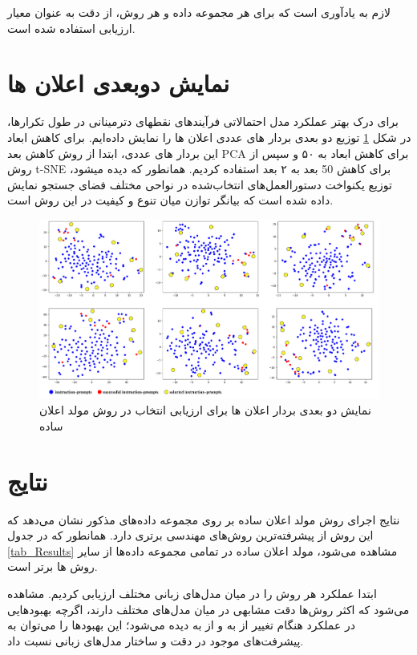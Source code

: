 لازم به یادآوری است که برای هر مجموعه داده و هر روش، از دقت به عنوان معیار ارزیابی استفاده شده است.
     
\section{نمایش دوبعدی اعلان ها}
برای درک بهتر عملکرد مدل احتمالاتی فرآیندهای نقطه\/ای دترمینانی در طول تکرارها، در شکل \ref{fig_visualize-dpp} توزیع دو بعدی بردار های عددی اعلان ها را نمایش داده‌ایم.
برای کاهش ابعاد این  بردار های عددی، ابتدا از روش کاهش بعد PCA \cite{pca} برای کاهش ابعاد به ۵۰ و سپس از روش t-SNE \cite{tsne} برای کاهش 50 بعد به ۲ بعد استفاده کردیم.
همانطور که دیده می\/شود، توزیع یکنواخت دستورالعمل‌های انتخاب‌شده در نواحی مختلف فضای جستجو نمایش داده شده است که بیانگر توازن میان تنوع و کیفیت در این روش است.

\begin{figure}[!ht]
	\centering
	\includegraphics[width=140mm]{images/eval}
	\caption{نمایش دو بعدی بردار اعلان ها برای ارزیابی انتخاب در روش مولد اعلان ساده}
	\label{fig_visualize-dpp}
\end{figure}

     
\section{نتایج}
نتایج اجرای روش مولد اعلان ساده بر روی مجموعه داده‌های مذکور نشان می‌دهد که این روش از پیشرفته‌ترین روش‌های مهندسی برتری دارد. همانطور که در جدول \ref{tab_Results} مشاهده می‌شود، مولد اعلان ساده در تمامی مجموعه داده‌ها از سایر روش ها برتر است.

ابتدا عملکرد هر روش را در میان مدل‌های زبانی مختلف ارزیابی کردیم. مشاهده می‌شود که اکثر روش‌ها دقت مشابهی در میان مدل‌های مختلف دارند، اگرچه بهبودهایی در عملکرد هنگام تغییر از 
به 
و از 
 به 
  دیده می‌شود؛ این بهبودها را می‌توان به پیشرفت‌های موجود در دقت و ساختار مدل‌های زبانی نسبت داد. 

